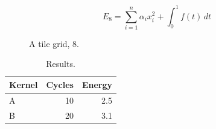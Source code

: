 \documentclass[10pt,twocolumn]{article}
\begin{document}
\begin{equation}\label{eq:8} E_8 = \sum_{i=1}^{n} \alpha_i x_i^2 + \int_0^1 f(t)\,dt\end{equation}

\begin{figure}[t]\centering{}\caption{A tile grid, 8.}\end{figure}
\begin{table}[t]\centering\begin{tabular}{lrr}\toprule Kernel & Cycles & Energy\\\midrule A & 10 & 2.5\\ B & 20 & 3.1\\\bottomrule\end{tabular}\caption{Results.}\end{table}
\end{document}
